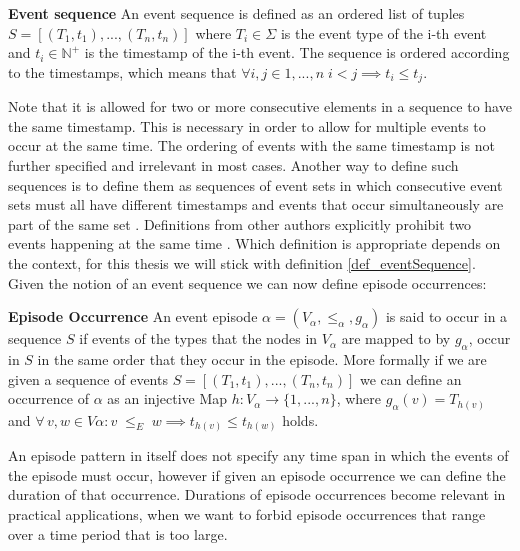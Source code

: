 \begin{mydef}
\label{def_eventSequence}
\textbf{Event sequence} An event sequence is defined as an ordered list of tuples $S = [ (T_1,t_1),..., (T_n,t_n) ] $ where $T_i \in \Sigma$ is the event type of the i-th event and $t_i \in \mathbb{N}^+$ is the timestamp of the i-th event. The sequence is ordered according to the timestamps, which means that $\forall i,j \in {1,...,n} \; i<j \implies t_i \leq t_j$. \cite{mannila1997discovery} %
\end{mydef}

Note that it is allowed for two or more consecutive elements in a sequence to have the same timestamp. This is necessary in order to allow for multiple events to occur at the same time. The ordering of events with the same timestamp is not further specified and irrelevant in most cases. Another way to define such sequences is to define them as sequences of event sets in which consecutive event sets must all have different timestamps and events that occur simultaneously are part of the same set \cite{bathoorn2007finding}. Definitions from other authors explicitly prohibit two events happening at the same time \cite{baumgarten2003tree}. Which definition is appropriate depends on the context, for this thesis we will stick with definition \ref{def_eventSequence}. \\
Given the notion of an event sequence we can now define episode occurrences:

\begin{mydef}
\label{def_episodeOccurrence}
\textbf{Episode Occurrence} An event episode $\alpha = (V_\alpha,{\leq}_{\alpha},g_\alpha)$ is said to occur in a sequence $S$ if events of the types that the nodes in $V_\alpha$ are mapped to by $g_\alpha$, occur in $S$ in the same order that they occur in the episode. More formally if we are given a sequence of events $S=[(T_1,t_1),...,(T_n,t_n)]$ we can define an occurrence of $\alpha$ as an injective Map $h:V_\alpha \rightarrow \{1,...,n\}$, where $g_\alpha (v) = T_{h(v)}$ and $\forall \, v,w \in V\alpha : v \;{\leq}_{E}\; w \implies t_{h(v)} \le t_{h(w)}$ holds. \cite{mannila1995discovering}
\end{mydef}

An episode pattern in itself does not specify any time span in which the events of the episode must occur, however if given an episode occurrence we can define the duration of that occurrence. Durations of episode occurrences become relevant in practical applications, when we want to forbid episode occurrences that range over a time period that is too large. 

